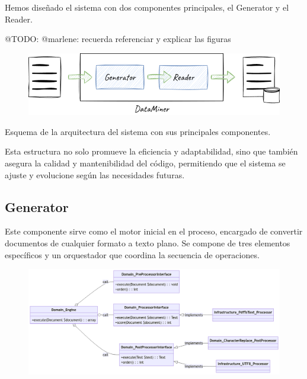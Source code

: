 Hemos diseñado el sistema con dos componentes principales, el Generator y el Reader.

\colorbox{color_highlight}{@TODO: @marlene:} recuerda referenciar y explicar las figuras

\begin{figure}
    \centering
    \includegraphics{./chapter/4/images/ad_4nxfvsrqaa0z4oog6ioupbhm9di1ks0uugteour8yll1z9polcxzput4la1osaqqlp61xyowlcejwkesovongxvd1rop2gxft}
    \caption{}
    \label{fig:ad_4nxfvsrqaa0z4oog6ioupbhm9di1ks0uugteour8yll1z9polcxzput4la1osaqqlp61xyowlcejwkesovongxvd1rop2gxft}
\end{figure}

Esquema de la arquitectura del sistema con sus principales componentes.

Esta estructura no solo promueve la eficiencia y adaptabilidad, sino que también asegura la calidad y mantenibilidad del código, permitiendo que el sistema se ajuste y evolucione según las necesidades futuras.

\subsection*{Generator}
Este componente sirve como el motor inicial en el proceso, encargado de convertir documentos de cualquier formato a texto plano. Se compone de tres elementos específicos y un orquestador que coordina la secuencia de operaciones.

\begin{figure}
    \centering
    \includegraphics{./chapter/4/images/ad_4nxcpbcugaqoykyq7hbpnr9p7_uswyuzipkcqvfkgc1fhoclp9cwrzu6zkoszpxi3zqsthvvftxotwhksqawgubuwqffg5gxn}
    \caption{}
    \label{fig:ad_4nxcpbcugaqoykyq7hbpnr9p7_uswyuzipkcqvfkgc1fhoclp9cwrzu6zkoszpxi3zqsthvvftxotwhksqawgubuwqffg5gxn}
\end{figure}

